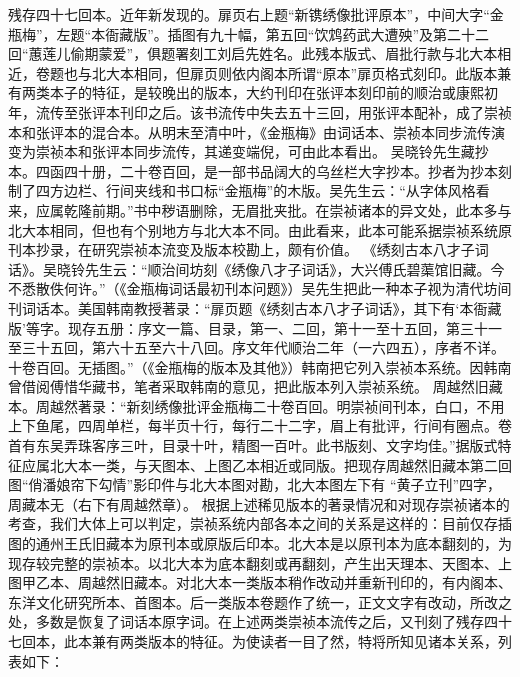 \documentclass[a4paper,12pt,UTF8,twoside]{ctexbook}
\begin{document}
残存四十七回本。近年新发现的。扉页右上题“新镌绣像批评原本”，中间大字“金瓶梅”，左题“本衙藏版”。插图有九十幅，第五回“饮鸩药武大遭殃”及第二十二回“蕙莲儿偷期蒙爱”，俱题署刻工刘启先姓名。此残本版式、眉批行款与北大本相近，卷题也与北大本相同，但扉页则依内阁本所谓“原本”扉页格式刻印。此版本兼有两类本子的特征，是较晚出的版本，大约刊印在张评本刻印前的顺治或康熙初年，流传至张评本刊印之后。该书流传中失去五十三回，用张评本配补，成了崇祯本和张评本的混合本。从明末至清中叶，《金瓶梅》由词话本、崇祯本同步流传演变为崇祯本和张评本同步流传，其递变端倪，可由此本看出。
吴晓铃先生藏抄本。四函四十册，二十卷百回，是一部书品阔大的乌丝栏大字抄本。抄者为抄本刻制了四方边栏、行间夹线和书口标“金瓶梅”的木版。吴先生云：“从字体风格看来，应属乾隆前期。”书中秽语删除，无眉批夹批。在崇祯诸本的异文处，此本多与北大本相同，但也有个别地方与北大本不同。由此看来，此本可能系据崇祯系统原刊本抄录，在研究崇祯本流变及版本校勘上，颇有价值。
《绣刻古本八才子词话》。吴晓铃先生云：“顺治间坊刻《绣像八才子词话》，大兴傅氏碧蕖馆旧藏。今不悉散佚何许。”（《金瓶梅词话最初刊本问题》）吴先生把此一种本子视为清代坊间刊词话本。美国韩南教授著录：“扉页题《绣刻古本八才子词话》，其下有‘本衙藏版’等字。现存五册：序文一篇、目录，第一、二回，第十一至十五回，第三十一至三十五回，第六十五至六十八回。序文年代顺治二年（一六四五），序者不详。十卷百回。无插图。”（《金瓶梅的版本及其他》）韩南把它列入崇祯本系统。因韩南曾借阅傅惜华藏书，笔者采取韩南的意见，把此版本列入崇祯系统。
周越然旧藏本。周越然著录：“新刻绣像批评金瓶梅二十卷百回。明崇祯间刊本，白口，不用上下鱼尾，四周单栏，每半页十行，每行二十二字，眉上有批评，行间有圈点。卷首有东吴弄珠客序三叶，目录十叶，精图一百叶。此书版刻、文字均佳。”据版式特征应属北大本一类，与天图本、上图乙本相近或同版。把现存周越然旧藏本第二回图“俏潘娘帘下勾情”影印件与北大本图对勘，北大本图左下有 “黄子立刊”四字，周藏本无（右下有周越然章）。
根据上述稀见版本的著录情况和对现存崇祯诸本的考查，我们大体上可以判定，崇祯系统内部各本之间的关系是这样的：目前仅存插图的通州王氏旧藏本为原刊本或原版后印本。北大本是以原刊本为底本翻刻的，为现存较完整的崇祯本。以北大本为底本翻刻或再翻刻，产生出天理本、天图本、上图甲乙本、周越然旧藏本。对北大本一类版本稍作改动并重新刊印的，有内阁本、东洋文化研究所本、首图本。后一类版本卷题作了统一，正文文字有改动，所改之处，多数是恢复了词话本原字词。在上述两类崇祯本流传之后，又刊刻了残存四十七回本，此本兼有两类版本的特征。为使读者一目了然，特将所知见诸本关系，列表如下：
\end{document}
